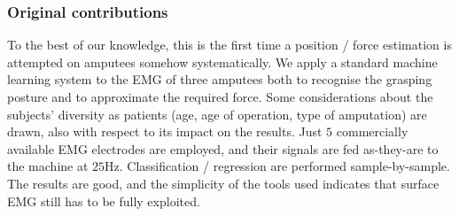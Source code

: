 \subsubsection{Original contributions}

To the best of our knowledge, this is the first time a position / force estimation
is attempted on amputees somehow systematically. We apply a standard machine learning
system to the EMG of three amputees both to recognise the grasping posture and
to approximate the required force. Some considerations about the subjects' diversity
as patients (age, age of operation, type of amputation) are drawn, also with respect to
its impact on the results. Just $5$ commercially available EMG electrodes are
employed, and their signals are fed as-they-are to the machine at $25$Hz.
Classification / regression are performed sample-by-sample. The results are
good, and the simplicity of the tools used indicates that surface EMG still has to be
fully exploited.
